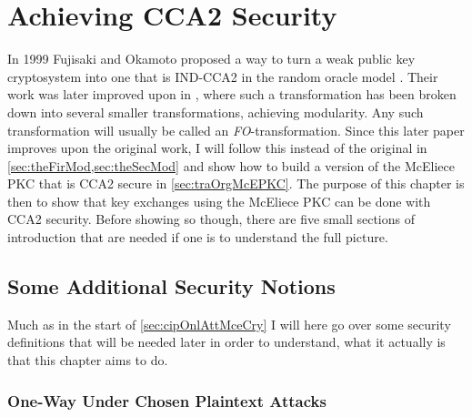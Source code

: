 
\chapter{Achieving CCA2 Security}
\label{chap:achCCA2Sec}

In 1999 Fujisaki and Okamoto proposed a way to turn a weak public key cryptosystem into one that is IND-CCA2 in the random oracle model \cite{FO}. Their work was later improved upon in \cite{HHK}, where such a transformation has been broken down into several smaller transformations, achieving modularity. Any such transformation will usually be called an \emph{FO}-transformation. Since this later paper improves upon the original work, I will follow this instead of the original in \cref{sec:theFirMod,sec:theSecMod} and show how to build a version of the McEliece PKC that is CCA2 secure in \cref{sec:traOrgMcEPKC}. The purpose of this chapter is then to show that key exchanges using the McEliece PKC can be done with CCA2 security. Before showing so though, there are five small sections of introduction that are needed if one is to understand the full picture.



\section{Some Additional Security Notions}
\label{sec:somAddSecNot}

Much as in the start of \cref{sec:cipOnlAttMceCry} I will here go over some security definitions that will be needed later in order to understand, what it actually is that this chapter aims to do.



\subsection{One-Way Under Chosen Plaintext Attacks}
\label{subsec:OWUCPA}


